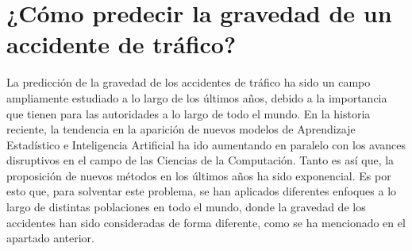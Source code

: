 \documentclass{uathesis-es}
\begin{document}


\section{¿Cómo predecir la gravedad de un accidente de tráfico?}





La predicción de la gravedad de los accidentes de tráfico ha sido un campo ampliamente estudiado a lo largo de los últimos años, debido a la importancia que tienen para las autoridades a lo largo de todo el mundo. En la historia reciente, la tendencia en la aparición de nuevos modelos de Aprendizaje Estadístico e Inteligencia Artificial ha ido aumentando en paralelo con los avances disruptivos en el campo de las Ciencias de la Computación. Tanto es así que, la proposición de nuevos métodos en los últimos años ha sido exponencial. Es por esto que, para solventar este problema, se han aplicados diferentes enfoques a lo largo de distintas poblaciones en todo el mundo, donde la gravedad de los accidentes han sido consideradas de forma diferente, como se ha mencionado en el apartado anterior.
\end{document}

